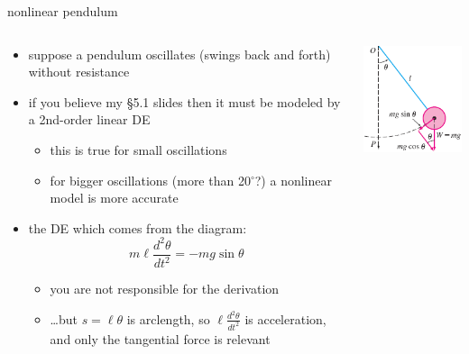 \documentclass[dvipsnames,colorlinks]{beamer}
\begin{document}
\begin{frame}{nonlinear pendulum}

\begin{columns}
\begin{column}{0.7\textwidth}
\begin{itemize}
\item suppose a pendulum oscillates (swings back and forth) without resistance
\item if you believe my \S5.1 slides then it must be modeled by a 2nd-order linear DE
     \begin{itemize}
     \item this is true for small oscillations 
     \item for bigger oscillations (more than 20$^\circ$?) a nonlinear model is more accurate
     \end{itemize}
\item the DE which comes from the diagram:
    $$m \ell \frac{d^2\theta}{dt^2} = - mg \sin\theta$$

\vspace{-2mm}
     \begin{itemize}
     \item you are not responsible for the derivation
     \item \dots but $s=\ell \theta$ is arclength, so $\ell \frac{d^2\theta}{dt^2}$ is acceleration, and only the tangential force is relevant
     \end{itemize}
\end{itemize}
\end{column}
\begin{column}{0.3\textwidth}
\includegraphics[width=\textwidth]{figs/pendulum}
\end{column}
\end{columns}
\end{frame}
\end{document}
